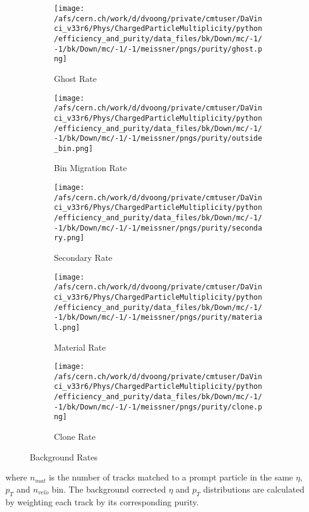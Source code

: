 \begin{figure}
	\centering
	\begin{subfigure}[h]{0.49\textwidth}
		\texttt{[image: /afs/cern.ch/work/d/dvoong/private/cmtuser/DaVinci\_v33r6/Phys/ChargedParticleMultiplicity/python/efficiency\_and\_purity/data\_files/bk/Down/mc/-1/-1/bk/Down/mc/-1/-1/meissner/pngs/purity/ghost.png]}
		\caption{Ghost Rate}
		\label{}
	\end{subfigure}
	\begin{subfigure}[h]{0.49\textwidth}
		\texttt{[image: /afs/cern.ch/work/d/dvoong/private/cmtuser/DaVinci\_v33r6/Phys/ChargedParticleMultiplicity/python/efficiency\_and\_purity/data\_files/bk/Down/mc/-1/-1/bk/Down/mc/-1/-1/meissner/pngs/purity/outside\_bin.png]}
		\caption{Bin Migration Rate}
		\label{}
	\end{subfigure}
	\begin{subfigure}[h]{0.49\textwidth}
		\texttt{[image: /afs/cern.ch/work/d/dvoong/private/cmtuser/DaVinci\_v33r6/Phys/ChargedParticleMultiplicity/python/efficiency\_and\_purity/data\_files/bk/Down/mc/-1/-1/bk/Down/mc/-1/-1/meissner/pngs/purity/secondary.png]}
		\caption{Secondary Rate}
		\label{}
	\end{subfigure}
	\begin{subfigure}[h]{0.49\textwidth}
		\texttt{[image: /afs/cern.ch/work/d/dvoong/private/cmtuser/DaVinci\_v33r6/Phys/ChargedParticleMultiplicity/python/efficiency\_and\_purity/data\_files/bk/Down/mc/-1/-1/bk/Down/mc/-1/-1/meissner/pngs/purity/material.png]}
		\caption{Material Rate}
		\label{}
	\end{subfigure}
	\begin{subfigure}[h]{0.49\textwidth}
		\texttt{[image: /afs/cern.ch/work/d/dvoong/private/cmtuser/DaVinci\_v33r6/Phys/ChargedParticleMultiplicity/python/efficiency\_and\_purity/data\_files/bk/Down/mc/-1/-1/bk/Down/mc/-1/-1/meissner/pngs/purity/clone.png]}
		\caption{Clone Rate}
		\label{}
	\end{subfigure}
	\caption{Background Rates}
	\label{fig: background rates}
\end{figure}

where $n_{mat}$ is the number of tracks matched to a prompt particle in the same $\eta$, $p_T$ and $n_{velo}$ bin. The background corrected $\eta$ and $p_T$ distributions are calculated by weighting each track by its corresponding purity. 

